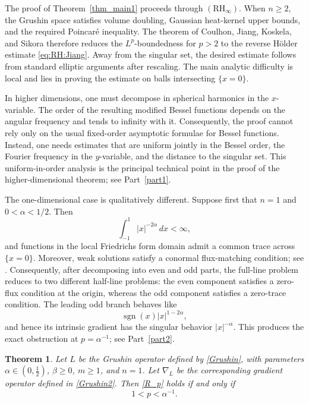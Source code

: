 \documentclass[12pt]{amsart}
\newtheorem{theorem}{Theorem}[section]
\begin{document}
The proof of Theorem~\ref{thm_main1} proceeds through
$(\mathrm{RH}_\infty)$. When $n\geq2$, the Grushin space satisfies volume doubling, Gaussian heat-kernel upper bounds, and the required Poincar\'e inequality. The theorem of Coulhon, Jiang, Koskela, and Sikora therefore reduces the $L^p$-boundedness for $p>2$ to the reverse H\"older estimate \eqref{eq:RH:Jiang}. Away from the singular set, the desired estimate follows from standard elliptic arguments after rescaling. The main analytic difficulty is local and lies in proving the estimate on balls intersecting $\{x=0\}$.

In higher dimensions, one must decompose in spherical harmonics in the
$x$-variable. The order of the resulting modified Bessel functions depends on the angular frequency and tends to infinity with it. Consequently, the proof cannot rely only on the usual fixed-order asymptotic formulae for Bessel functions. Instead, one needs estimates that are uniform jointly in the Bessel order, the Fourier frequency in the $y$-variable, and the distance to the singular set. This uniform-in-order analysis is the principal technical point in the proof of the higher-dimensional theorem; see Part~\ref{part1}.

The one-dimensional case is qualitatively different. Suppose first that $n=1$ and $0<\alpha<1/2$. Then
\begin{equation*}
    \int_{-1}^1|x|^{-2\alpha}\,dx<\infty,
\end{equation*}
and functions in the local Friedrichs form domain admit a common trace across $\{x=0\}$. Moreover, weak solutions satisfy a conormal flux-matching condition; see \cite{RS_1D}. Consequently, after decomposing into even and odd parts, the full-line problem reduces to two different half-line problems: the even component satisfies a zero-flux condition at the origin, whereas the odd component satisfies a zero-trace condition. The leading odd branch behaves like
\begin{equation*}
    \operatorname{sgn}(x)|x|^{1-2\alpha},
\end{equation*}
and hence its intrinsic gradient has the singular behavior
$|x|^{-\alpha}$. This produces the exact obstruction at
$p=\alpha^{-1}$; see Part~\ref{part2}.

\begin{theorem}\label{thm:n=1:alpha<1/2}
Let $L$ be the Grushin operator defined by \eqref{Grushin}, with parameters
$\alpha\in(0,\frac12)$, $\beta\geq0$, $m\geq1$, and $n=1$. Let $\nabla_L$ be
the corresponding gradient operator defined in \eqref{Grushin2}. Then
\eqref{R_p} holds if and only if
\begin{equation*}
    1<p<\alpha^{-1}.
\end{equation*}
\end{theorem}
\end{document}
